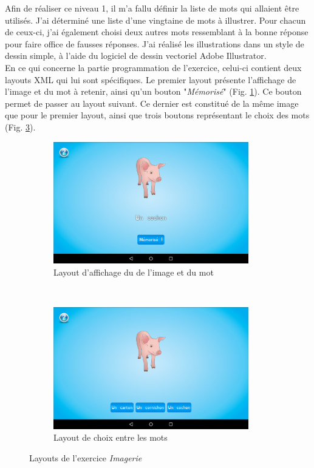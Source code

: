 Afin de réaliser ce niveau 1, il m'a fallu définir la liste de mots qui allaient être utilisés. J'ai déterminé une liste d'une vingtaine de mots à illustrer. Pour chacun de ceux-ci, j'ai également choisi deux autres mots ressemblant à la bonne réponse pour faire office de fausses réponses. J'ai réalisé les illustrations dans un style de dessin simple, à l'aide du logiciel de dessin vectoriel Adobe Illustrator. \\


En ce qui concerne la partie programmation de l'exercice, celui-ci contient deux layouts XML qui lui sont spécifiques. Le premier layout présente l'affichage de l'image et du mot à retenir, ainsi qu'un bouton "\textit{Mémorisé}" (Fig. \ref{imgS}). Ce bouton permet de passer au layout suivant. Ce dernier est constitué de la même image que pour le premier layout, ainsi que trois boutons représentant le choix des mots (Fig. \ref{imgF}).\\

\begin{figure}[H]
\centering
\begin{subfigure}[t]{8.5cm}
\includegraphics[width=8.5cm]{img/img-start.png}
\caption{Layout d'affichage du de l'image et du mot}
\label{imgS}
\end{subfigure}
~
\begin{subfigure}[t]{8.5cm}
\includegraphics[width=8.5cm]{img/img-choix.png}
\caption{Layout de choix entre les mots}
\label{imgF}
\end{subfigure}
\caption{Layouts de l'exercice \textit{Imagerie}}
\end{figure}

